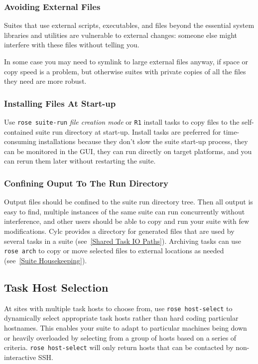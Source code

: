 \subsubsection{Avoiding External Files}

Suites that use external scripts, executables, and files beyond the essential
system libraries and utilities are vulnerable to external changes: someone
else might interfere with these files without telling you.

In some case you may need to symlink to large external files anyway, if space
or copy speed is a problem, but otherwise suites with private copies of all the
files they need are more robust.

\subsubsection{Installing Files At Start-up}

Use \lstinline=rose suite-run= {\em file creation mode} or \lstinline=R1=
install tasks to copy files to the self-contained suite run directory at
start-up.  Install tasks are preferred for time-consuming installations because
they don't slow the suite start-up process, they can be monitored in the GUI,
they can run directly on target platforms, and you can rerun them later without
restarting the suite. 

\subsubsection{Confining Ouput To The Run Directory}

Output files should be confined to the suite run directory tree. Then all
output is easy to find, multiple instances of the same suite can run
concurrently without interference, and other users should be able to copy and
run your suite with few modifications. Cylc provides a \lstinline@share@
directory for generated files that are used by several tasks in a suite
(see~\ref{Shared Task IO Paths}). Archiving tasks can use \lstinline=rose arch=
to copy or move selected files to external locations as needed (see~\ref{Suite
Housekeeping}).

\subsection{Task Host Selection}

At sites with multiple task hosts to choose from, use
\lstinline=rose host-select= to dynamically select appropriate task hosts
rather than hard coding particular hostnames. This enables your suite to
adapt to particular machines being down or heavily overloaded by selecting
from a group of hosts based on a series of criteria.
\lstinline=rose host-select= will only return hosts that can be contacted by
non-interactive SSH.

